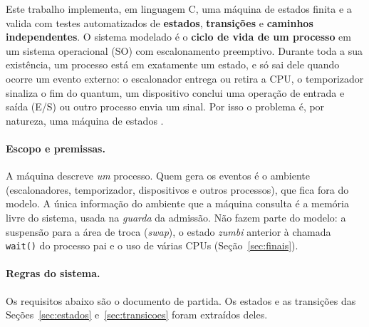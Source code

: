 \documentclass[11pt,a4paper]{article}
\theoremstyle{definition}
\begin{document}
Este trabalho implementa, em linguagem C, uma máquina de estados finita e a valida com testes
automatizados de \textbf{estados}, \textbf{transições} e \textbf{caminhos independentes}. O
sistema modelado é o \textbf{ciclo de vida de um processo} em um sistema operacional (SO) com
escalonamento preemptivo. Durante toda a sua existência, um processo está em exatamente um estado,
e só sai dele quando ocorre um evento externo: o escalonador entrega ou retira a CPU, o temporizador
sinaliza o fim do quantum, um dispositivo conclui uma operação de entrada e saída (E/S) ou outro
processo envia um sinal. Por isso o problema é, por natureza, uma máquina de estados
\cite{silberschatz,tanenbaum}.

\paragraph{Escopo e premissas.} A máquina descreve \emph{um} processo. Quem gera os eventos é o
ambiente (escalonadores, temporizador, dispositivos e outros processos), que fica fora do modelo. A
única informação do ambiente que a máquina consulta é a memória livre do sistema, usada na
\emph{guarda} da admissão. Não fazem parte do modelo: a suspensão para a área de troca
(\emph{swap}), o estado \emph{zumbi} anterior à chamada \texttt{wait()} do processo pai e o uso de
várias CPUs (Seção~\ref{sec:finais}).

\paragraph{Regras do sistema.} Os requisitos abaixo são o documento de partida. Os estados e as
transições das Seções~\ref{sec:estados} e~\ref{sec:transicoes} foram extraídos deles.
\end{document}
